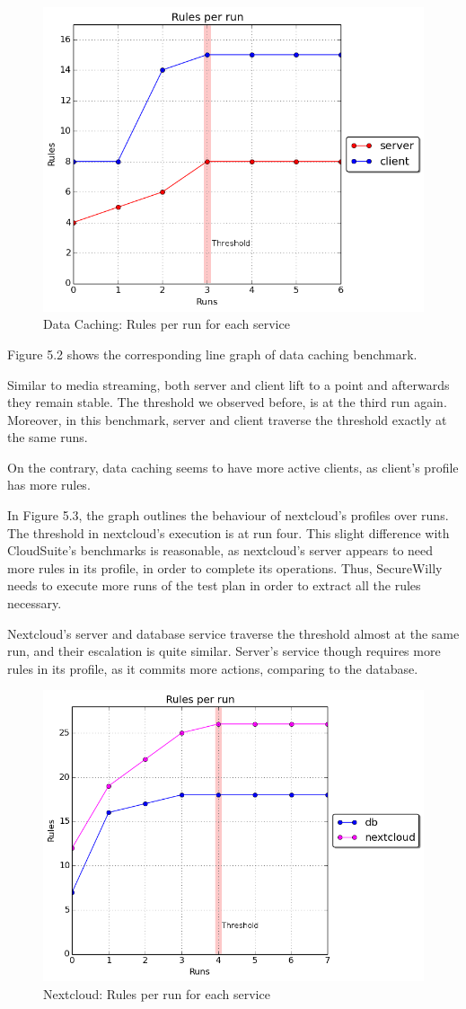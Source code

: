 \begin{figure}[h!]
  \centering
   \includegraphics[width=0.70\linewidth]{../figures/datacaching/rulesthreshold.png}
   \caption{Data Caching: Rules per run for each service}
\end{figure}

Figure 5.2 shows the corresponding line graph of data caching benchmark.

Similar to media streaming, both server and client lift to a point and afterwards they remain stable. The threshold we observed before, is at the third run again. Moreover, in this benchmark, server and client traverse the threshold exactly at the same runs.

On the contrary, data caching seems to have more active clients, as client's profile has more rules.

In Figure 5.3, the graph outlines the behaviour of nextcloud's profiles over runs. The threshold in nextcloud's execution is at run four. This slight difference with CloudSuite's benchmarks is reasonable, as nextcloud's server appears to need more rules in its profile, in order to complete its operations. Thus, SecureWilly needs to execute more runs of the test plan in order to extract all the rules necessary.

Nextcloud's server and database service traverse the threshold almost at the same run, and their escalation is quite similar. Server's service though requires more rules in its profile, as it commits more actions, comparing to the database.

\begin{figure}[h!]
  \centering
   \includegraphics[width=0.75\linewidth]{../figures/nextcloud/rulesthreshold.png}
   \caption{Nextcloud: Rules per run for each service}
\end{figure}
\hfill\break

